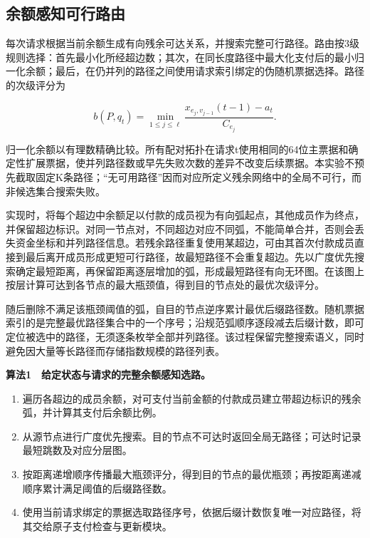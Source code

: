 \documentclass[UTF8,a4paper,twocolumn,fontset=none,zihao=5]{ctexart}
\newcommand{\algtitle}[1]{\par\Needspace{6\baselineskip}\smallskip\noindent\textbf{#1}\par\smallskip}
\begin{document}
\subsection{余额感知可行路由}

每次请求根据当前余额生成有向残余可达关系，并搜索完整可行路径。路由按3级规则选择：首先最小化所经超边数；其次，在同长度路径中最大化支付后的最小归一化余额；最后，在仍并列的路径之间使用请求索引绑定的伪随机票据选择。路径的次级评分为



\begin{equation}
b(P,q_t)=\min_{1\leq j\leq\ell}\frac{x_{e_j,v_{j-1}}(t-1)-a_t}{C_{e_j}}.
\label{eq:6}\end{equation}


归一化余额以有理数精确比较。所有配对拓扑在请求t使用相同的64位主票据和确定性扩展票据，使并列路径数或早先失败次数的差异不改变后续票据。本实验不预先截取固定K条路径；“无可用路径”因而对应所定义残余网络中的全局不可行，而非候选集合搜索失败。


实现时，将每个超边中余额足以付款的成员视为有向弧起点，其他成员作为终点，并保留超边标识。对同一节点对，不同超边对应不同弧，不能简单合并，否则会丢失资金坐标和并列路径信息。若残余路径重复使用某超边，可由其首次付款成员直接到最后离开成员形成更短可行路径，故最短路径不会重复超边。先以广度优先搜索确定最短距离，再保留距离逐层增加的弧，形成最短路径有向无环图。在该图上按层计算可达到各节点的最大瓶颈值，得到目的节点处的最优次级评分。


随后删除不满足该瓶颈阈值的弧，自目的节点逆序累计最优后缀路径数。随机票据索引的是完整最优路径集合中的一个序号；沿规范弧顺序逐段减去后缀计数，即可定位被选中的路径，无须逐条枚举全部并列路径。该过程保留完整搜索语义，同时避免因大量等长路径而存储指数规模的路径列表。


\algtitle{算法1　给定状态与请求的完整余额感知选路。}\begin{enumerate}

\item 遍历各超边的成员余额，对可支付当前金额的付款成员建立带超边标识的残余弧，并计算其支付后余额比例。

\item 从源节点进行广度优先搜索。目的节点不可达时返回全局无路径；可达时记录最短跳数及对应分层图。

\item 按距离递增顺序传播最大瓶颈评分，得到目的节点的最优瓶颈；再按距离递减顺序累计满足阈值的后缀路径数。

\item 使用当前请求绑定的票据选取路径序号，依据后缀计数恢复唯一对应路径，将其交给原子支付检查与更新模块。

\end{enumerate}
\end{document}
